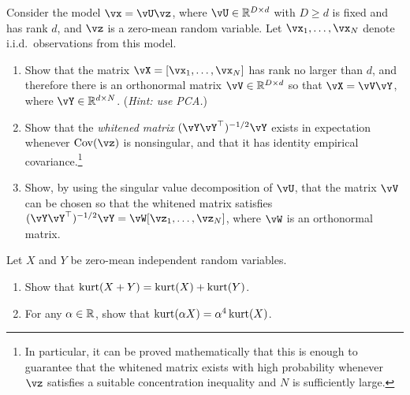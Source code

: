 \documentclass[../../book-main.tex]{subfiles}
\begin{document}
\begin{exercise}\label{exercise:whitening}
    Consider the model $\vx = \vU \vz$, where $\vU \in \R^{D \times d}$ with $D \geq d$ is fixed and has rank $d$, and $\vz$ is a zero-mean random variable. Let $\vx_1, \dots, \vx_N$ denote i.i.d.\ observations from this model.
    \begin{enumerate}
        \item Show that the matrix $\vX = [\vx_1, \dots, \vx_N]$ has rank no larger than $d$, and therefore there is an orthonormal matrix $\vV \in \R^{D \times d}$ so that $\vX = \vV \vY$, where $\vY \in \R^{d \times N}$. (\textit{Hint: use PCA.})
        \item Show that the \textit{whitened matrix} $(\vY \vY^\top)^{-1/2}\vY$ exists in expectation whenever $\Cov(\vz)$ is nonsingular, and that it has identity empirical covariance.\footnote{In particular, it can be proved mathematically that this is enough to guarantee that the whitened matrix exists with high probability whenever $\vz$ satisfies a suitable concentration inequality and $N$ is sufficiently large.}
        \item Show, by using the singular value decomposition of $\vU$, that the matrix $\vV$ can be chosen so that the whitened matrix satisfies $(\vY \vY^\top)^{-1/2} \vY = \vW [\vz_1, \dots, \vz_N]$, where $\vW$ is an orthonormal matrix.
    \end{enumerate}
\end{exercise}

\begin{exercise}\label{exercise:kurtosis-linearity-properties}
    Let $X$ and $Y$ be zero-mean independent random variables.
    \begin{enumerate}
        \item Show that $\mathop{\mathrm{kurt}}(X + Y) = \mathop{\mathrm{kurt}}(X) + \mathop{\mathrm{kurt}}(Y)$.
        \item For any $\alpha \in \mathbb{R}$, show that $\mathop{\mathrm{kurt}}(\alpha X) = \alpha^4 \mathop{\mathrm{kurt}}(X)$.
    \end{enumerate}
\end{exercise}
\end{document}
